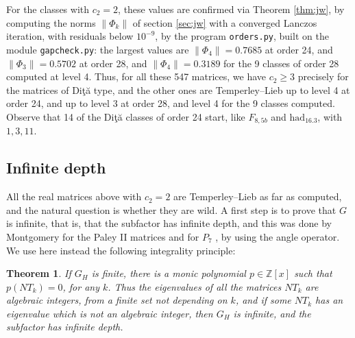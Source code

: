 \documentclass[11pt]{amsart}
\newtheorem{theorem}{Theorem}[section]
\begin{document}
\medskip

\noindent For the classes with $c_2=2$, these values are confirmed via Theorem \ref{thm:jw}, by computing the norms $\|\Phi_k\|$ of section \ref{sec:jw} with a converged Lanczos iteration, with residuals below $10^{-9}$, by the program \texttt{orders.py}, built on the module \texttt{gapcheck.py}: the largest values are $\|\Phi_4\|=0.7685$ at order 24, and $\|\Phi_3\|=0.5702$ at order 28, and $\|\Phi_4\|=0.3189$ for the 9 classes of order 28 computed at level 4. Thus, for all these 547 matrices, we have $c_2\geq3$ precisely for the matrices of Di\c t\u a type, and the other ones are Temperley--Lieb up to level 4 at order 24, and up to level 3 at order 28, and level 4 for the 9 classes computed. Observe that 14 of the Di\c t\u a classes of order 24 start, like $F_{8,5b}$ and $\mathrm{had}_{16.3}$, with $1,3,11$.

\subsection{Infinite depth}\label{sec:infdepth}

All the real matrices above with $c_2=2$ are Temperley--Lieb as far as computed, and the natural question is whether they are wild. A first step is to prove that $G$ is infinite, that is, that the subfactor has infinite depth, and this was done by Montgomery for the Paley II matrices and for $P_7$ \cite{mo2,mo3}, by using the angle operator. We use here instead the following integrality principle:

\begin{theorem}\label{thm:integral}
If $G_H$ is finite, there is a monic polynomial $p\in\mathbb Z[x]$ such that $p(NT_k)=0$, for any $k$. Thus the eigenvalues of all the matrices $NT_k$ are algebraic integers, from a finite set not depending on $k$, and if some $NT_k$ has an eigenvalue which is not an algebraic integer, then $G_H$ is infinite, and the subfactor has infinite depth.
\end{theorem}
\end{document}
